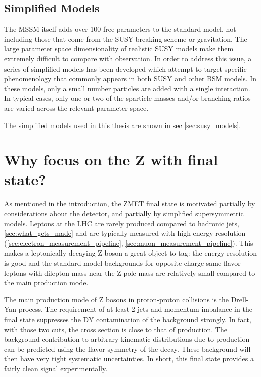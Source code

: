   \subsection{Simplified Models}
    The MSSM itself adds over 100 free parameters to the standard model, not including those that come from the SUSY breaking scheme or gravitation. The large parameter space dimensionality of realistic SUSY models make them extremely difficult to compare with observation. In order to address this issue, a series of simplified models has been developed which attempt to target specific phenomenology that commonly appears in both SUSY and other BSM models. In these models, only a small number particles are added with a single interaction. In typical cases, only one or two of the sparticle masses and/or branching ratios are varied across the relevant parameter space. \cite{cms_sms} \cite{SMS} \cite{SmodelS}

    The simplified models used in this thesis are shown in sec \ref{sec:susy_models}.
    
\section{Why focus on the Z with \MET final state?}
  As mentioned in the introduction, the ZMET final state is motivated partially by considerations about the detector, and partially by simplified supersymmetric models. Leptons at the LHC are rarely produced compared to hadronic jets,\ref{sec:what_gets_made} and are typically measured with high energy resolution (\ref{sec:electron_measurement_pipeline}, \ref{sec:muon_measurement_pipeline}). This makes a leptonically decaying Z boson a great object to tag: the energy resolution is good and the standard model backgrounds for opposite-charge same-flavor leptons with dilepton mass near the Z pole mass are relatively small compared to the main production mode. 

  The main production mode of Z bosons in proton-proton collisions is the Drell-Yan process. The requirement of at least 2 jets and momentum imbalance in the final state suppresses the DY contamination of the background strongly. In fact, with those two cuts, the cross section is close to that of \ttbar production. The background contribution to arbitrary kinematic distributions due to \ttbar production can be predicted using the flavor symmetry of the decay. These background will then have very tight systematic uncertainties. In short, this final state provides a fairly clean signal experimentally.

